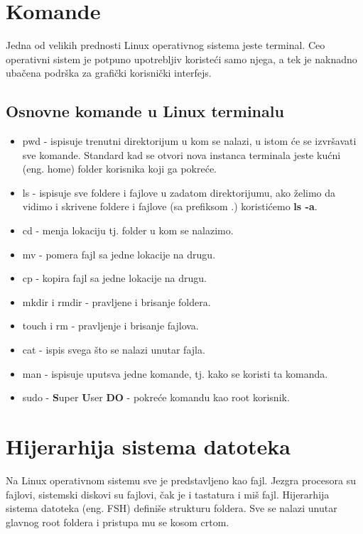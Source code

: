\documentclass[a4paper,14pt]{article}
\begin{document}
\section{Komande}
Jedna od velikih prednosti Linux operativnog sistema jeste terminal. Ceo operativni sistem je potpuno upotrebljiv koristeći samo njega, a tek je naknadno ubačena podrška za grafički korisnički interfejs.
\subsection{Osnovne komande u Linux terminalu}
\begin{itemize}
\item pwd - ispisuje trenutni direktorijum u kom se nalazi, u istom će se izvršavati sve komande. Standard kad se otvori nova instanca terminala jeste kućni (eng. home) folder korisnika koji ga pokreće.
\item ls - ispisuje sve foldere i fajlove u zadatom direktorijumu, ako želimo da vidimo i skrivene foldere i fajlove (sa prefiksom .) koristićemo \textbf{ls -a}.
\item cd - menja lokaciju tj. folder u kom se nalazimo.
\item mv - pomera fajl sa jedne lokacije na drugu.
\item cp - kopira fajl sa jedne lokacije na drugu.
\item mkdir i rmdir - pravljene i brisanje foldera.
\item touch i rm - pravljenje i brisanje fajlova.
\item cat - ispis svega što se nalazi unutar fajla.
\item man - ispisuje uputsva jedne komande, tj. kako se koristi ta komanda.
\item sudo - \textbf{S}uper \textbf{U}ser \textbf{DO} - pokreće komandu kao root korisnik.
\end{itemize}
\newpage

\section{Hijerarhija sistema datoteka}
Na Linux operativnom sistemu sve je predstavljeno kao fajl. Jezgra procesora su fajlovi, sistemski diskovi su fajlovi, čak je i tastatura i miš fajl. Hijerarhija sistema datoteka (eng. FSH) definiše strukturu foldera. Sve se nalazi unutar glavnog root foldera i pristupa mu se kosom crtom.
\end{document}
